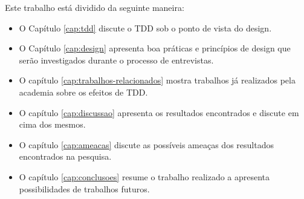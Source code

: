 Este trabalho está dividido da seguinte maneira: 

\begin{itemize}
	\item O Capítulo \ref{cap:tdd} discute o TDD sob o ponto de vista do design.
  
	\item O Capítulo \ref{cap:design} apresenta boa práticas e princípios de design
	que serão investigados durante o processo de entrevistas.

	\item O capítulo \ref{cap:trabalhos-relacionados} mostra trabalhos já
	realizados pela academia sobre os efeitos de TDD.
	
	\item O capítulo \ref{cap:discussao} apresenta os resultados encontrados e
	discute em cima dos mesmos.
	
	\item O capítulo \ref{cap:ameacas} discute as possíveis ameaças dos resultados
	encontrados na pesquisa.
	
	\item O capítulo \ref{cap:conclusoes} resume o trabalho realizado a apresenta
	possibilidades de trabalhos futuros.
\end{itemize}
